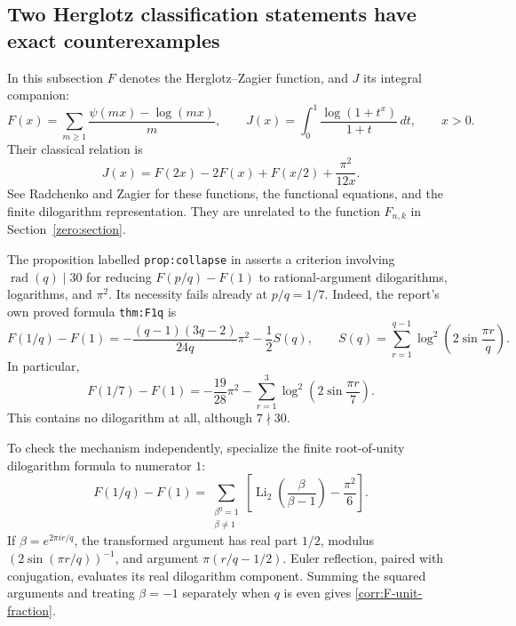\subsection{Two Herglotz classification statements have exact counterexamples}
\label{corr:herglotz}

In this subsection $F$ denotes the Herglotz--Zagier function, and
$J$ its integral companion:
\[
 F(x)=\sum_{m\geq1}\frac{\psi(mx)-\log(mx)}{m},\qquad
 J(x)=\int_0^1\frac{\log(1+t^x)}{1+t}\,dt,\qquad x>0.
\]
Their classical relation is
\begin{equation}\label{corr:J-F}
 J(x)=F(2x)-2F(x)+F(x/2)+\frac{\pi^2}{12x}.
\end{equation}
See Radchenko and Zagier \cite{RadchenkoZagier2023} for these functions,
the functional equations, and the finite dilogarithm representation.
They are unrelated to the function $F_{n,k}$ in
Section~\ref{zero:section}.

The proposition labelled \texttt{prop:collapse} in
 asserts a criterion
involving $\operatorname{rad}(q)\mid30$ for reducing $F(p/q)-F(1)$
to rational-argument dilogarithms, logarithms, and $\pi^2$.
Its necessity fails already at $p/q=1/7$.  Indeed, the report's own
proved formula \texttt{thm:F1q} is
\begin{equation}\label{corr:F-unit-fraction}
 F(1/q)-F(1)
 =-\frac{(q-1)(3q-2)}{24q}\pi^2-\frac12 S(q),
 \qquad
 S(q)=\sum_{r=1}^{q-1}\log^2\left(2\sin\frac{\pi r}{q}\right).
\end{equation}
In particular,
\begin{equation}\label{corr:F-seventh}
 F(1/7)-F(1)
   =-\frac{19}{28}\pi^2
      -\sum_{r=1}^{3}\log^2\left(2\sin\frac{\pi r}{7}\right).
\end{equation}
This contains no dilogarithm at all, although $7\nmid30$.

To check the mechanism independently, specialize the finite
root-of-unity dilogarithm formula to numerator $1$:
\[
 F(1/q)-F(1)=
 \sum_{\substack{\beta^q=1\\\beta\ne1}}
   \left[\operatorname{Li}_2\left(\frac{\beta}{\beta-1}\right)
          -\frac{\pi^2}{6}\right].
\]
If $\beta=e^{2\pi i r/q}$, the transformed argument has real part
$1/2$, modulus $(2\sin(\pi r/q))^{-1}$, and argument
$\pi(r/q-1/2)$.  Euler reflection, paired with conjugation, evaluates
its real dilogarithm component.  Summing the squared arguments and
treating $\beta=-1$ separately when $q$ is even gives
\eqref{corr:F-unit-fraction}.


